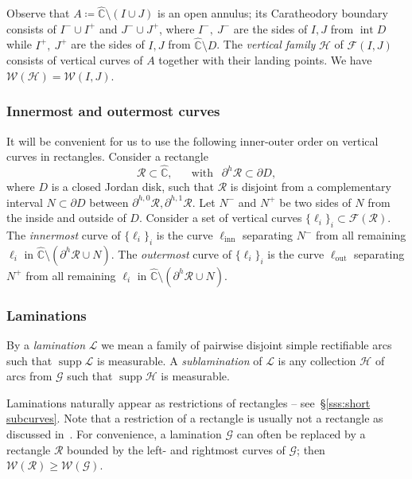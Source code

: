 \documentclass{amsart}
\renewcommand{\sp}{{\ \ }}
\newcommand{\1}{{\mathbb 1 }}
\newcommand{\FamG}{{\mathcal G}}
\newcommand{\FamH}{{\mathcal H}}
\newcommand{\Fam}{{\mathcal F}}
\newcommand{\Width}{{\mathcal W}}
\newcommand\LL{{\mathcal L}}
\newcommand\RR{\mathcal{R}}
\newcommand\intr{\operatorname{int}}
\newcommand\inn{{\operatorname{inn}}}
\newcommand\out{{\operatorname{out}}}
\newcommand{\wC}{\widehat{\mathbb{C}}}
\theoremstyle{remark}
\numberwithin{equation}{section}
\theoremstyle{definition}
\newcommand{\supp}{\operatorname{supp}}
\begin{document}
Observe that $A\coloneqq \wC\setminus (I\cup J)$ is an open annulus; its Caratheodory boundary consists of $I^-\cup I^+$ and $J^-\cup J^+$, where $I^-, \ J^-$ are the sides of $I,J$ from $\intr D$ while $I^+, \ J^+$ are the sides of $I,J$ from $\wC\setminus  D$. The \emph{vertical family} $\FamH$ of $\Fam(I,J)$ consists of vertical curves of $A$ together with their landing points. We have $\Width(\FamH) =\Width(I,J)$. 



\subsubsection{Innermost and outermost curves} \label{sss:inner outer order} It will be convenient for us to use the following inner-outer order on vertical curves in rectangles.
Consider a rectangle
\[ \RR\subset \wC,\sp\sp\sp\text{ with }\sp \partial ^h \RR\subset \partial D,\]
where $D$ is a closed Jordan disk, such that $\RR$ is disjoint from a complementary interval $N\subset \partial D$ between $\partial ^{h,0}\RR, \partial ^{h,1}\RR$. Let $N^-$ and $N^+$ be two sides of $N$ from the inside and outside of $D$. Consider a set of vertical curves $\{\ell_i\}_i\subset \Fam(\RR)$. The \emph{innermost} curve of $\{\ell_i\}_i$ is the curve $\ell_\inn$ 
separating $N^-$ from all remaining $\ell_i$ in $\wC\setminus (\partial^h \RR \cup N)$. The \emph{outermost} curve of $\{\ell_i\}_i$ is the curve $\ell_\out$ separating $N^+$ from all remaining $\ell_i$ in $\wC\setminus (\partial^h \RR \cup N)$.


\subsubsection{Laminations}\label{sss:App:Lam}  By a \emph{lamination} $\LL$ we mean a family of pairwise disjoint simple rectifiable arcs such that $\supp \LL$ is measurable. A \emph{sublamination} of $\LL$ is any collection $\FamH$ of arcs from $\FamG$ such that $\supp \FamH$ is measurable. 





Laminations naturally appear as restrictions of rectangles -- see~\S\ref{sss:short subcurves}.  Note that a restriction of a rectangle is usually not a rectangle as discussed in~\cite[\S2.3]{KL}.  For convenience, a lamination $\FamG$ can often be replaced by a rectangle $\RR$ bounded by the left- and rightmost curves of $\FamG$; then $\Width(\RR)\ge \Width(\FamG)$.
\end{document}
